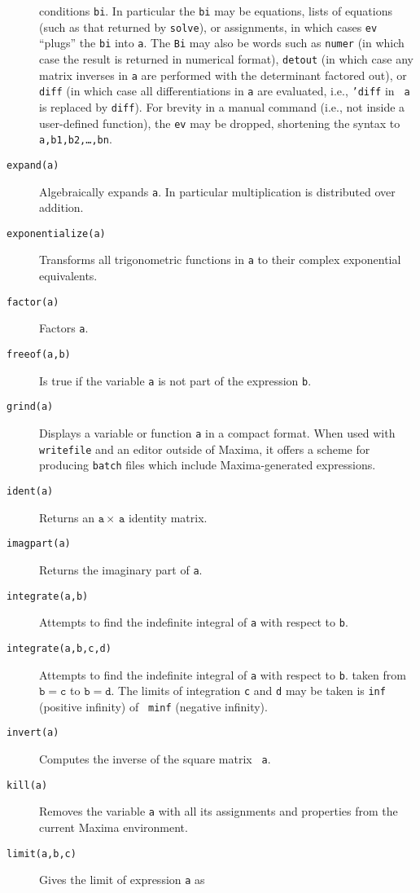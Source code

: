 \documentclass[a4paper,12pt]{article}
\begin{document}
\begin{description}
  conditions {\tt bi}.  In particular the {\tt bi} may be equations,
  lists of equations (such as that returned by {\tt solve}), or
  assignments, in which cases {\tt ev} ``plugs'' the {\tt bi} into
  {\tt a}.  The {\tt Bi} may also be words such as {\tt numer} (in
  which case the result is returned in numerical format), {\tt detout}
  (in which case any matrix inverses in {\tt a} are performed with the
  determinant factored out), or {\tt diff} (in which case all
  differentiations in {\tt a} are evaluated, i.e., {\tt 'diff} in {\tt
    a} is replaced by {\tt diff}).  For brevity in a manual command
  (i.e., not inside a user-defined function), the {\tt ev} may be
  dropped, shortening the syntax to {\tt a,b1,b2,\ldots,bn}.
\item[{\tt expand(a)}] Algebraically expands {\tt a}.  In particular
  multiplication is distributed over addition.
\item[{\tt exponentialize(a)}] Transforms all trigonometric functions
  in {\tt a} to their complex exponential equivalents.
\item[{\tt factor(a)}] Factors {\tt a}.
\item[{\tt freeof(a,b)}] Is true if the variable {\tt a} is not part
  of the expression {\tt b}.
\item[{\tt grind(a)}] Displays a variable or function {\tt a} in a
  compact format.  When used with {\tt writefile} and an editor
  outside of Maxima, it offers a scheme for producing {\tt batch}
  files which include Maxima-generated expressions.
\item[{\tt ident(a)}] Returns an $\mathtt{a} \times\, \mathtt{a}$
  identity matrix.
\item[{\tt imagpart(a)}] Returns the imaginary part of {\tt a}.
\item[{\tt integrate(a,b)}] Attempts to find the indefinite integral
  of {\tt a} with respect to {\tt b}.
\item[{\tt integrate(a,b,c,d)}] Attempts to find the indefinite
  integral of {\tt a} with respect to {\tt b}. taken from
  $\mathtt{b=c}$ to $\mathtt{b=d}$.  The limits of integration {\tt c}
  and {\tt d} may be taken is {\tt inf} (positive infinity) of {\tt
    minf} (negative infinity).
\item[{\tt invert(a)}] Computes the inverse of the square matrix {\tt
    a}.
\item[{\tt kill(a)}] Removes the variable {\tt a} with all its
  assignments and properties from the current Maxima environment.
\item[{\tt limit(a,b,c)}] Gives the limit of expression {\tt a} as

\end{description}
\end{document}
